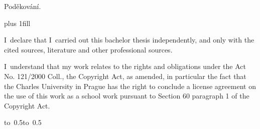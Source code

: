 \documentclass[12pt,a4paper,fleqn]{report}
\let\openright=\clearpage
\begin{document}
\newpage


\openright

\noindent
Poděkování.



\vglue 0pt plus 1fill

\noindent
I~declare that I~carried out this bachelor thesis independently, and only with
the cited sources, literature and other professional sources.

\medskip\noindent
I~understand that my work relates to the rights and obligations under the Act
No. 121/2000 Coll., the Copyright Act, as amended, in particular the fact that
the Charles University in Prague has the right to conclude a license agreement
on the use of this work as a school work pursuant to Section 60 paragraph 1 of
the Copyright Act.

\vspace{10mm}

\hbox{\hbox to 0.5\hbox to 0.5}

\vspace{20mm}
\newpage

\end{document}
